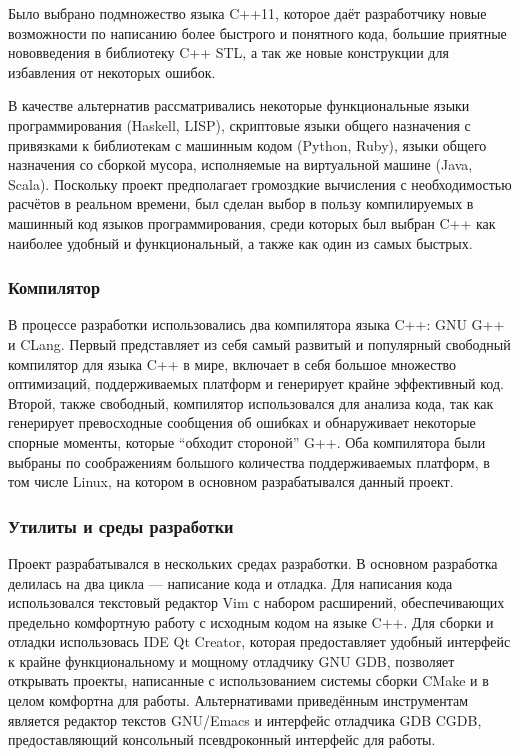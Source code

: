 \documentclass[a4paper,12pt]{report}
\numberwithin{equation}{section}
\begin{document}
Было выбрано подмножество языка C++11, которое даёт разработчику новые возможности по написанию более быстрого и понятного кода, большие приятные нововведения в библиотеку C++ STL, а так же новые конструкции для избавления от некоторых ошибок.

В качестве альтернатив рассматривались некоторые функциональные языки программирования (Haskell, LISP), скриптовые языки общего назначения с привязками к библиотекам с машинным кодом (Python, Ruby), языки общего назначения со сборкой мусора, исполняемые на виртуальной машине (Java, Scala). Поскольку проект предполагает громоздкие вычисления с необходимостью расчётов в реальном времени, был сделан выбор в пользу компилируемых в машинный код языков программирования, среди которых был выбран C++ как наиболее удобный и функциональный, а также как один из самых быстрых.

\subsubsection{Компилятор}
В процессе разработки использовались два компилятора языка C++: GNU G++ и CLang. Первый представляет из себя самый развитый и популярный свободный компилятор для языка C++ в мире, включает в себя большое множество оптимизаций, поддерживаемых платформ и генерирует крайне эффективный код. Второй, также свободный, компилятор использовался для анализа кода, так как генерирует превосходные сообщения об ошибках и обнаруживает некоторые спорные моменты, которые ``обходит стороной'' G++. Оба компилятора были выбраны по соображениям большого количества поддерживаемых платформ, в том числе Linux, на котором в основном разрабатывался данный проект.

\subsubsection{Утилиты и среды разработки}
Проект разрабатывался в нескольких средах разработки. В основном разработка делилась на два цикла --- написание кода и отладка. Для написания кода использовался текстовый редактор Vim с набором расширений, обеспечивающих предельно комфортную работу с исходным кодом на языке C++. Для сборки и отладки использовась IDE Qt Creator, которая предоставляет удобный интерфейс к крайне функциональному и мощному отладчику GNU GDB, позволяет открывать проекты, написанные с использованием системы сборки CMake и в целом комфортна для работы. Альтернативами приведённым инструментам является редактор текстов GNU/Emacs и интерфейс отладчика GDB CGDB, предоставляющий консольный псевдроконный интерфейс для работы.
\end{document}

